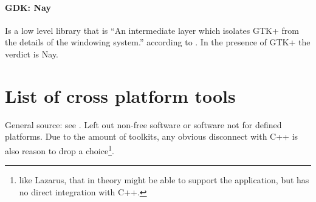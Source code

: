 \paragraph{GDK: Nay} Is a low level library that is ``An intermediate layer
which isolates GTK+ from the details of the windowing system.'' according to
\cite{gnome:gdk3}. In the presence of GTK+ the verdict is Nay.

\section{List of cross platform tools}

General source: see \cite{wiki:xplatf}. Left out non-free software or software
not for defined platforms. Due to the amount of toolkits, any obvious
disconnect with C++ is also reason to drop a choice\footnote{like Lazarus, that
in theory might be able to support the application, but has no direct
integration with C++.}.

